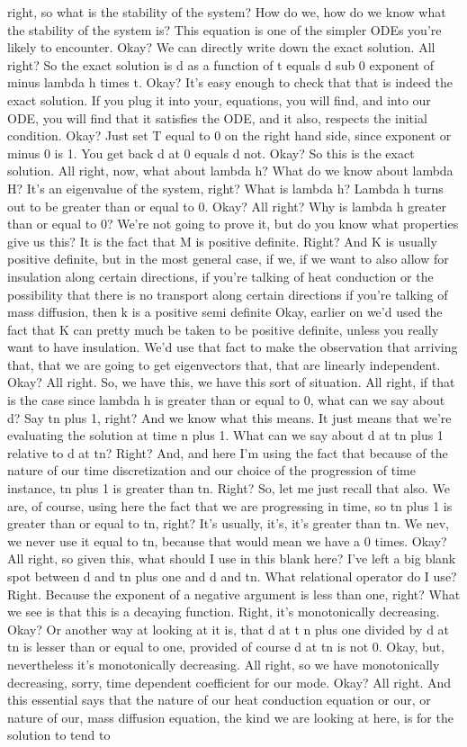 \documentclass[10pt]{article}
\begin{document}
right, so what is the stability of the system? How do we, how do we know what the stability of the system is? This equation is one of the simpler ODEs you're likely to encounter. Okay? We can directly write down the exact solution. All right? So the exact solution is d as a function of t equals d sub 0 exponent of minus lambda h times t. Okay? It's easy enough to check that that is indeed the exact solution. If you plug it into your, equations, you will find, and into our ODE, you will find that it satisfies the ODE, and it also, respects the initial condition. Okay? Just set T equal to 0 on the right hand side, since exponent or minus 0 is 1. You get back d at 0 equals d not. Okay? So this is the exact solution. All right, now, what about lambda h? What do we know about lambda H? It's an eigenvalue of the system, right? What is lambda h? Lambda h turns out to be greater than or equal to 0. Okay? All right? Why is lambda h greater than or equal to 0? We're not going to prove it, but do you know what properties give us this? It is the fact that M is positive definite. Right? And K is usually positive definite, but in the most general case, if we, if we want to also allow for insulation along certain directions, if you're talking of heat conduction or the possibility that there is no transport along certain directions if you're talking of mass diffusion, then k is a positive semi definite Okay, earlier on we'd used the fact that K can pretty much be taken to be positive definite, unless you really want to have insulation. We'd use that fact to make the observation that arriving that, that we are going to get eigenvectors that, that are linearly independent. Okay? All right. So, we have this, we have this sort of situation. All right, if that is the case since lambda h is greater than or equal to 0, what can we say about d? Say tn plus 1, right? And we know what this means. It just means that we're evaluating the solution at time n plus 1. What can we say about d at tn plus 1 relative to d at tn? Right? And, and here I'm using the fact that because of the nature of our time discretization and our choice of the progression of time instance, tn plus 1 is greater than tn. Right? So, let me just recall that also. We are, of course, using here the fact that we are progressing in time, so tn plus 1 is greater than or equal to tn, right? It's usually, it's, it's greater than tn. We nev, we never use it equal to tn, because that would mean we have a 0 times. Okay? All right, so given this, what should I use in this blank here? I've left a big blank spot between d and tn plus one and d and tn. What relational operator do I use? Right. Because the exponent of a negative argument is less than one, right? What we see is that this is a decaying function. Right, it's monotonically decreasing. Okay? Or another way at looking at it is, that d at t n plus one divided by d at tn is lesser than or equal to one, provided of course d at tn is not 0. Okay, but, nevertheless it's monotonically decreasing. All right, so we have monotonically decreasing, sorry, time dependent coefficient for our mode. Okay? All right. And this essential says that the nature of our heat conduction equation or our, or nature of our, mass diffusion equation, the kind we are looking at here, is for the solution to tend to 
\end{document}
